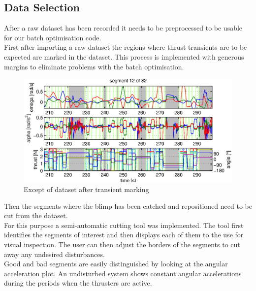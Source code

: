 \subsection{Data Selection}
\label{sub:data_selection}
After a raw dataset has been recorded it needs to be preprocessed to be usable for our batch optimisation code.\\
First after importing a raw dataset the regions where thrust transients are to be expected are marked in the dataset.
This process is implemented with generous margins to eliminate problems with the batch optimisation. \\
\begin{figure}[htbp]
\centering
\includegraphics[width = \textwidth]{images/interactive_cut/interactive_cut_long_modified.eps}
\caption{Except of dataset after transient marking}
\end{figure}
Then the segments where the blimp has been catched and repositioned need to be cut from the dataset. \\
For this purpose a semi-automatic cutting tool was implemented. 
The tool first identifies the segments of interest and then displays each of them to the use for visual inspection.
The user can then adjust the borders of the segments to cut away any undesired disturbances. \\
Good and bad segments are easily distinguished by looking at the angular acceleration plot.
An undisturbed system shows constant angular accelerations during the periods when the thrusters are active. \\
